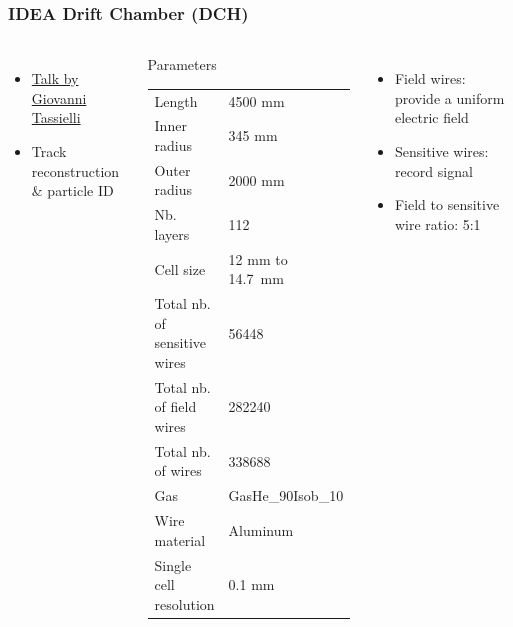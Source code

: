 \documentclass[aspectratio=169, hyperref={colorlinks=true,pdfpagelabels=false,linkcolor=black}, xcolor=dvipsnames,10pt]{beamer}
\begin{document}
\begin{frame}
	\frametitle{IDEA Drift Chamber (DCH)}
	
	\begin{columns}	
	
	\begin{itemize}
	\item \href{https://indico.cern.ch/event/656491/contributions/2939121/attachments/1629781/2597342/IDEA-CDCH_FCCweek18.pdf}{Talk by Giovanni Tassielli}
	\item Track reconstruction \& particle ID
	\end{itemize}


	\begin{block}{Parameters}
  	\begin{table}
    	\begin{adjustbox}{max width=\textwidth}
    	  \begin{tabular}{l l}
    	    \toprule
        Length & 4500 mm \\ 
        Inner radius & 345 mm \\
        Outer radius & 2000 mm\\
        Nb. layers & 112 \\
        Cell size & 12 mm to 14.7~mm\\
        Total nb. of sensitive wires & 56448 \\
        Total nb. of field wires & 282240 \\
        Total nb. of wires & 338688 \\
        Gas & GasHe\_90Isob\_10 \\
        Wire material & Aluminum \\
        Single cell resolution & 0.1 mm \\
        \bottomrule
      \end{tabular}
    	\end{adjustbox}
  	\end{table}
	\end{block}


	
	\begin{itemize}
	\item Field wires: provide a uniform electric field
	\item Sensitive wires: record signal
	\item Field to sensitive wire ratio: 5:1
	\end{itemize}
	

\end{columns}
\end{frame}
\end{document}
